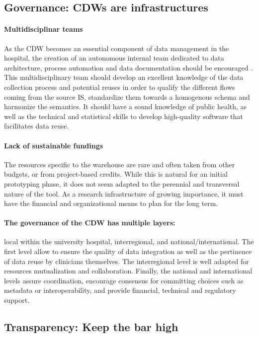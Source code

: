 \documentclass[french,12pt,twoside,a4paper]{book}
\begin{document}
\subsection{Governance: CDWs are infrastructures}%
\label{subsec:cdw:recommendations:governance}%

\paragraph{Multidisciplinar teams} As the CDW becomes an essential component of data management in the hospital,
the creation of an autonomous internal team dedicated to data architecture,
process automation and data documentation should be encouraged
\citep{goldacre_better_2022}. This multidisciplinary team should develop an
excellent knowledge of the data collection process and potential reuses in order
to qualify the different flows coming from the source IS, standardize them
towards a homogenous schema and harmonize the semantics. It should have a sound
knowledge of public health, as well as the technical and statistical skills to
develop high-quality software that facilitates data reuse.

\paragraph{Lack of sustainable fundings} The resources specific to the warehouse are rare and often taken from other
budgets, or from project-based credits. While this is natural for an initial
prototyping phase, it does not seem adapted to the perennial and transversal
nature of the tool. As a research infrastructure of growing importance, it must
have the financial and organizational means to plan for the long term.

\paragraph{The governance of the CDW has multiple layers:} local within the
university hospital, interregional, and national/international. The first level
allow to ensure the quality of data integration as well as the pertinence of
data reuse by clinicians themselves. The interregional level is well adapted for
resources mutualization and collaboration. Finally, the national and
international levels assure coordination, encourage consensus for committing
choices such as metadata or interoperability, and provide financial, technical
and regulatory support.


\subsection{Transparency: Keep the bar high}%
\label{subsec:cdw:recommendations:transparency}%
\end{document}
